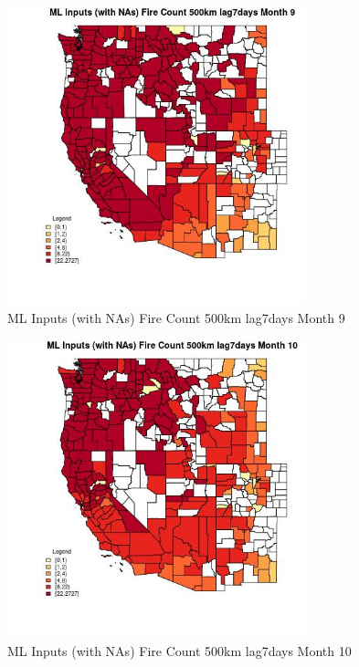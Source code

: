 \clearpage 

\begin{figure} 
\centering  
\includegraphics[width=0.77\textwidth]{Code_Outputs/Report_ML_input_PM25_Step4_part_f_de_duplicated_aves_prioritize_24hr_obswNAs_CountyFire_Count_500km_lag7daysmedianMonth9.jpg} 
\caption{\label{fig:Report_ML_input_PM25_Step4_part_f_de_duplicated_aves_prioritize_24hr_obswNAsCountyFire_Count_500km_lag7daysmedianMonth9}ML Inputs (with NAs) Fire Count 500km lag7days Month 9} 
\end{figure} 
 

\begin{figure} 
\centering  
\includegraphics[width=0.77\textwidth]{Code_Outputs/Report_ML_input_PM25_Step4_part_f_de_duplicated_aves_prioritize_24hr_obswNAs_CountyFire_Count_500km_lag7daysmedianMonth10.jpg} 
\caption{\label{fig:Report_ML_input_PM25_Step4_part_f_de_duplicated_aves_prioritize_24hr_obswNAsCountyFire_Count_500km_lag7daysmedianMonth10}ML Inputs (with NAs) Fire Count 500km lag7days Month 10} 
\end{figure} 
 


